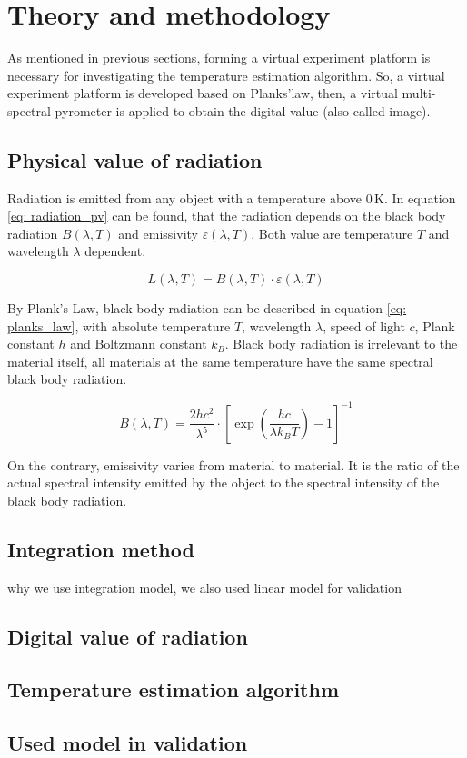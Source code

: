 \chapter{Theory and methodology}%
As mentioned in previous sections, forming a virtual experiment platform 
is necessary for investigating the temperature estimation algorithm. So, a virtual 
experiment platform is developed based on Planks'law, then, a virtual multi-spectral 
pyrometer is applied to obtain the digital value (also called image). 


\section{Physical value of radiation}%
Radiation is emitted from any object with a temperature above $0 \, \text{K}$. In equation \ref{eq: radiation_pv}
can be found, that the radiation depends on the black body radiation $B(\lambda, T)$ 
and emissivity $\varepsilon(\lambda, T)$. Both value are temperature $T$ and wavelength $\lambda$ 
dependent.

\begin{equation}
    \label{eq: radiation_pv}
    L(\lambda, T) = B(\lambda, T) \cdot \varepsilon (\lambda, T)
\end{equation}


By Plank's Law, black body radiation can be described in equation \ref{eq: planks_law}, 
with absolute temperature $T$, wavelength $\lambda$, speed of light $c$, Plank 
constant $h$ and Boltzmann constant $k_B$. Black body radiation is irrelevant 
to the material itself, all materials at the same temperature have the same spectral 
black body radiation.

\begin{equation}
    \label{eq: planks_law}
    B(\lambda, T) = \frac{{2hc^2}}{{\lambda^5}} \cdot {\left[{\exp\left(\frac{{hc}}{{\lambda k_B T}}\right) - 1}\right]}^{-1}
\end{equation}


On the contrary, emissivity varies from material to material. It is the 
ratio of the actual spectral intensity emitted by the object to the spectral 
intensity of the black body radiation.

\section{Integration method}%
why we use integration model, we also used linear model for validation
%
%
\section{Digital value of radiation}%

%
%

\section{Temperature estimation algorithm}


\section{Used model in validation}%

%
%
